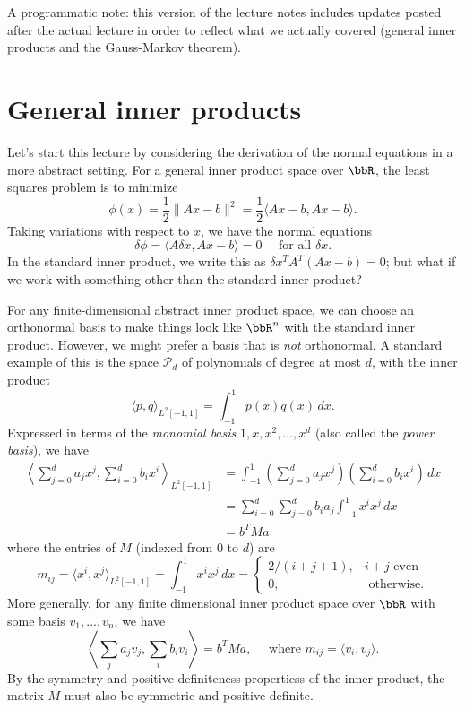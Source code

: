 \documentclass[12pt, leqno]{article} %
\begin{document}


A programmatic note: this version of the lecture notes includes
updates posted after the actual lecture in order to reflect what we
actually covered (general inner products and the Gauss-Markov
theorem).

\section{General inner products}

Let's start this lecture by considering the derivation of the normal
equations in a more abstract setting.  For a general inner product
space over $\bbR$, the least squares problem is to minimize
\[
  \phi(x) = \frac{1}{2} \|Ax-b\|^2 = \frac{1}{2} \langle Ax-b, Ax-b \rangle.
\]
Taking variations with respect to $x$, we have the normal equations
\[
  \delta \phi = \langle A \delta x, Ax-b \rangle = 0 \quad
  \mbox{ for all } \delta x.
\]
In the standard inner product, we write this as
$\delta x^T A^T (Ax-b) = 0$; but what if we work with something
other than the standard inner product?

For any finite-dimensional abstract inner product space, we can choose
an orthonormal basis to make things look like $\bbR^n$ with the
standard inner product.  However, we might prefer a basis that is
{\em not} orthonormal.  A standard example of this is the space
$\mathcal{P}_d$ of polynomials of degree at most $d$, with the inner
product
\[
  \langle p, q \rangle_{L^2[-1,1]} = \int_{-1}^1 p(x) q(x) \, dx.
\]
Expressed in terms of the {\em monomial basis} $1, x, x^2, \ldots, x^d$
(also called the {\em power basis}), we have
\begin{align*}
  \left\langle
    \sum_{j=0}^d a_j x^j, \sum_{i=0}^d b_i x^i
  \right\rangle_{L^2[-1,1]}
  &= \int_{-1}^1 \left( \sum_{j=0}^d a_j x^j \right)
                \left( \sum_{i=0}^d b_i x^i \right) \, dx \\
  &= \sum_{i=0}^d \sum_{j=0}^d b_i a_j \int_{-1}^1 x^i x^j \, dx \\
  &= b^T M a
\end{align*}
where the entries of $M$ (indexed from $0$ to $d$) are
\[
  m_{ij}
  = \langle x^i, x^j \rangle_{L^2[-1,1]}
  = \int_{-1}^1 x^i x^j \, dx
  = \begin{cases}
      2/(i+j+1), & i+j \mbox{ even} \\
      0, & \mbox{ otherwise}.
     \end{cases}
\]
More generally, for any finite dimensional inner product space
over $\bbR$ with some basis $v_1, \ldots, v_n$, we have
\[
  \left\langle \sum_j a_j v_j, \sum_i b_i v_i \right\rangle =
  b^T M a, \quad \mbox{ where }
  m_{ij} = \langle v_i, v_j \rangle.
\]
By the symmetry and positive definiteness propertiess of the inner
product, the matrix $M$ must also be symmetric and positive definite.
\end{document}

